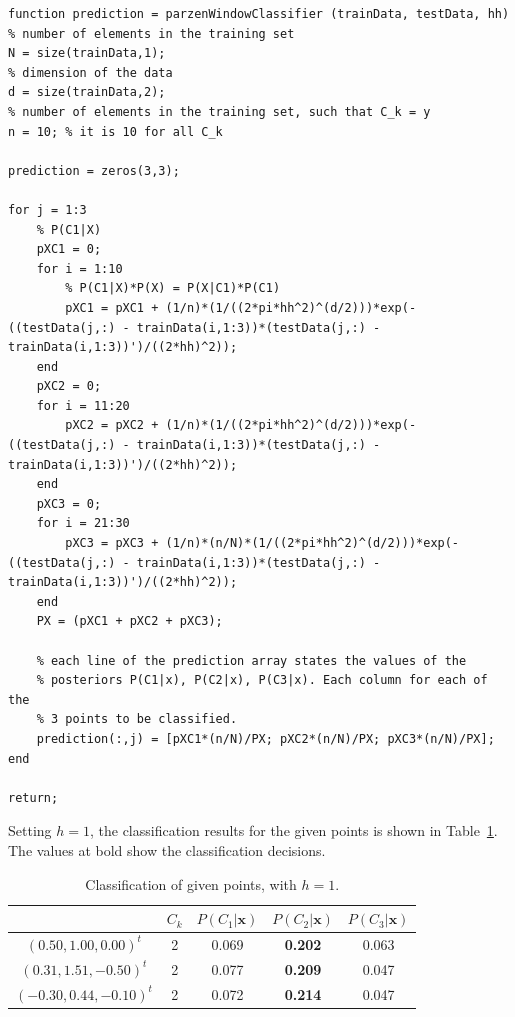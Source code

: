 \documentclass[paper=a4, fontsize=11pt]{scrartcl} %
\numberwithin{equation}{section} %
\numberwithin{figure}{section} %
\numberwithin{table}{section} %
\newcommand{\vertbreak}{\vspace{1.75 mm}}
\begin{document}
\begin{lstlisting}[label=lst:classifier,caption={MATLAB function for a 
classifier using Parzen window density estimation (a spherical Gaussian 
window function is used as kernel).}]
function prediction = parzenWindowClassifier (trainData, testData, hh)
% number of elements in the training set
N = size(trainData,1);
% dimension of the data
d = size(trainData,2);
% number of elements in the training set, such that C_k = y
n = 10; % it is 10 for all C_k

prediction = zeros(3,3);

for j = 1:3
    % P(C1|X)
    pXC1 = 0;
    for i = 1:10
        % P(C1|X)*P(X) = P(X|C1)*P(C1)
        pXC1 = pXC1 + (1/n)*(1/((2*pi*hh^2)^(d/2)))*exp(-((testData(j,:) - trainData(i,1:3))*(testData(j,:) - trainData(i,1:3))')/((2*hh)^2));
    end
    pXC2 = 0;
    for i = 11:20         
        pXC2 = pXC2 + (1/n)*(1/((2*pi*hh^2)^(d/2)))*exp(-((testData(j,:) - trainData(i,1:3))*(testData(j,:) - trainData(i,1:3))')/((2*hh)^2));
    end
    pXC3 = 0;
    for i = 21:30 
        pXC3 = pXC3 + (1/n)*(n/N)*(1/((2*pi*hh^2)^(d/2)))*exp(-((testData(j,:) - trainData(i,1:3))*(testData(j,:) - trainData(i,1:3))')/((2*hh)^2));
    end
    PX = (pXC1 + pXC2 + pXC3);
    
    % each line of the prediction array states the values of the 
    % posteriors P(C1|x), P(C2|x), P(C3|x). Each column for each of the 
    % 3 points to be classified.
    prediction(:,j) = [pXC1*(n/N)/PX; pXC2*(n/N)/PX; pXC3*(n/N)/PX];
end

return;
\end{lstlisting}

Setting $h = 1$, the classification results for the given points is shown in 
Table~\ref{tab:1-1-results}. The values at bold show the classification 
decisions.\vertbreak

\begin{table}[H]
\begin{center}
    \small
        \begin{tabularx}{0.60\textwidth}{ c | c | c | c | c }
                                    & $C_k$ & $P(C_1|\textbf{x})$ & $P(C_2|\textbf{x})$ & $P(C_3|\textbf{x})$\\ [0.5ex]
            \hline
            $(0.50,1.00,0.00)^t$    & 2 & 0.069 & \textbf{0.202} & 0.063 \\ [0.5ex]
            $(0.31,1.51,-0.50)^t$   & 2 & 0.077 & \textbf{0.209} & 0.047 \\ [0.5ex]
            $(-0.30,0.44,-0.10)^t$  & 2 & 0.072 & \textbf{0.214} & 0.047 \\ [0.5ex]
        \end{tabularx}
    \caption{Classification of given points, with $h = 1$.}
    \label{tab:1-1-results}
    \end{center}
\end{table}
\end{document}
